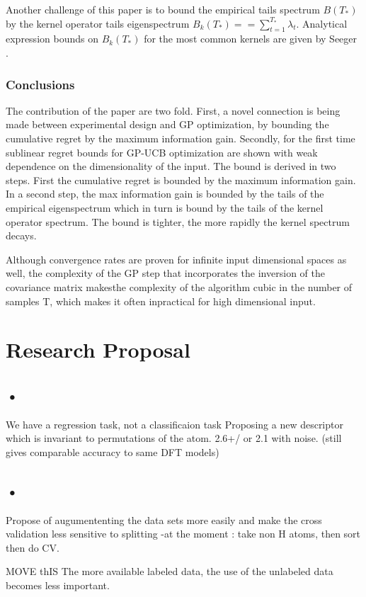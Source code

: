 \documentclass[10pt,journal,a4paper]{IEEEtran}
\begin{document}
Another challenge of this paper is to bound the empirical tails spectrum $B(T_{*})$ by the kernel operator tails eigenspectrum $B_k(T_{*}) == \sum_{t=1}^{T_*}\lambda_t $. Analytical expression bounds on $B_k(T_{*})$ for the most common kernels are given by Seeger \cite{NonGP}.		
		
\subsubsection{Conclusions}		
The contribution of the paper are two fold. First, a novel connection is being made between experimental design and GP optimization, by bounding the cumulative regret by the maximum information gain. Secondly, for the first time sublinear regret bounds for GP-UCB optimization are shown with weak dependence on the dimensionality of the input. 		
 The bound is derived in two steps. First the cumulative regret is bounded by the maximum information gain. In a second step, the max information gain is bounded by the tails of the empirical eigenspectrum which in turn is bound by the tails of the kernel operator spectrum.	The bound is tighter, the more rapidly the kernel spectrum decays. 

Although convergence rates are proven for infinite input dimensional spaces as well, the complexity of the GP step that incorporates the inversion of the covariance matrix makesthe complexity of the algorithm cubic in the number of samples T, which makes it often inpractical for high dimensional input.

\section{Research Proposal}
\subsection{•}
We have a regression task, not a classificaion task
Proposing a new descriptor which is invariant to permutations of the atom. 2.6+/ or 2.1 with noise. (still gives comparable accuracy to same DFT models)
\subsection{•}
Propose of augumententing the data sets more easily and make the cross validation
less sensitive to splitting -at the moment : take non H atoms, then sort then do CV.

MOVE thIS The more available labeled data, the use of the unlabeled data becomes less important.
\end{document}
